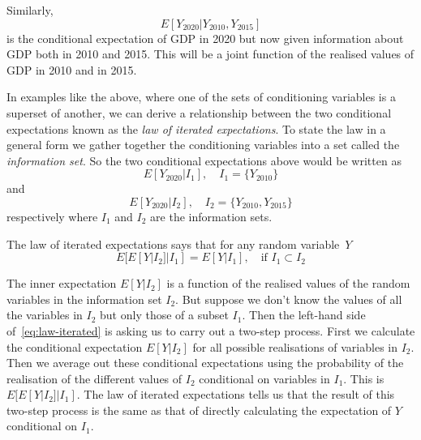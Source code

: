 \documentclass[11pt,reqno,openany]{amsbook}
\theoremstyle{plain}
\theoremstyle{definition}
\newcommand{\newterm}[1]{\emph{#1}}
\begin{document}
Similarly,
\[E[Y_{2020}|Y_{2010},Y_{2015}]\]
is the conditional expectation of GDP in 2020 but now given
information about  GDP both in 2010 and 2015. This will be a joint function
of the realised values of GDP in 2010 and in 2015.

In examples like the above, where one of the sets of conditioning
variables is a superset of another, we can derive a relationship
between the two conditional expectations known as the \newterm{law of
  iterated expectations}. To state the law in a general form we gather
together the conditioning variables into a set called the
\newterm{information set}. So the two conditional expectations above
would be written as
\[E[Y_{2020}|I_1], \quad I_1=\{Y_{2010}\}\]
and 
\[E[Y_{2020}|I_2], \quad I_2=\{Y_{2010},Y_{2015}\}\]
respectively where $I_1$ and $I_2$ are the information sets. 

The law of iterated expectations says that for any random variable~$Y$
\begin{equation}\label{eq:law-iterated}
E[E[Y|I_2]|I_1]=E[Y|I_1],\quad \text{if $I_1 \subset I_2$}
\end{equation}

The inner expectation $E[Y|I_2]$ is a function of the realised values
of the random variables in the information set $I_2$. But suppose we
don't know the values of all the variables in $I_2$ but only those of
a subset $I_1$. Then the left-hand side of~\eqref{eq:law-iterated} is
asking us to carry out a two-step process. First we calculate the
conditional expectation $E[Y|I_2]$ for all possible realisations of
variables in $I_2$. Then we average out these conditional expectations
using the probability of the realisation of the different
values of $I_2$ conditional on variables in $I_1$. This is
$E[E[Y|I_2]|I_1]$. The law of iterated
expectations tells us that the result of this two-step process is the
same as that of directly calculating the expectation of
$Y$ conditional on $I_1$.
\end{document}
